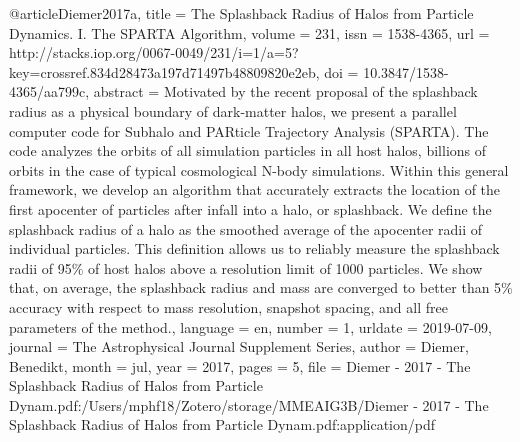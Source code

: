 {@article{Diemer2017a,
	title = {The {Splashback} {Radius} of {Halos} from {Particle} {Dynamics}. {I}. {The} {SPARTA} {Algorithm}},
	volume = {231},
	issn = {1538-4365},
	url = {http://stacks.iop.org/0067-0049/231/i=1/a=5?key=crossref.834d28473a197d71497b48809820e2eb},
	doi = {10.3847/1538-4365/aa799c},
	abstract = {Motivated by the recent proposal of the splashback radius as a physical boundary of dark-matter halos, we present a parallel computer code for Subhalo and PARticle Trajectory Analysis (SPARTA). The code analyzes the orbits of all simulation particles in all host halos, billions of orbits in the case of typical cosmological N-body simulations. Within this general framework, we develop an algorithm that accurately extracts the location of the ﬁrst apocenter of particles after infall into a halo, or splashback. We deﬁne the splashback radius of a halo as the smoothed average of the apocenter radii of individual particles. This deﬁnition allows us to reliably measure the splashback radii of 95\% of host halos above a resolution limit of 1000 particles. We show that, on average, the splashback radius and mass are converged to better than 5\% accuracy with respect to mass resolution, snapshot spacing, and all free parameters of the method.},
	language = {en},
	number = {1},
	urldate = {2019-07-09},
	journal = {The Astrophysical Journal Supplement Series},
	author = {Diemer, Benedikt},
	month = jul,
	year = {2017},
	pages = {5},
	file = {Diemer - 2017 - The Splashback Radius of Halos from Particle Dynam.pdf:/Users/mphf18/Zotero/storage/MMEAIG3B/Diemer - 2017 - The Splashback Radius of Halos from Particle Dynam.pdf:application/pdf}
}


}
